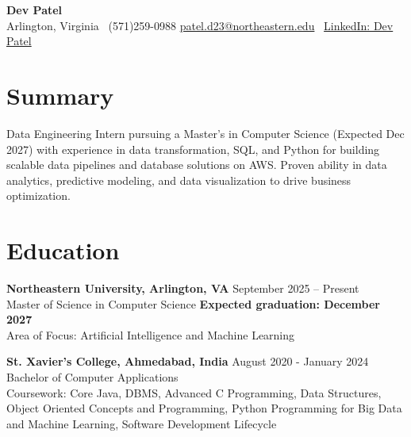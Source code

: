 \documentclass[a4paper,10pt]{article}
\begin{document}
\begin{center}
\vspace{-3mm}
    \fontsize{16}{18}\selectfont \textbf{Dev Patel} \\
    \vspace{0mm}
    \normalsize Arlington, Virginia \textbar\ (571)259-0988  \textbar       \href{mailto:patel.d23@northeastern.edu}{patel.d23@northeastern.edu} \textbar\ \href{https://www.linkedin.com/in/devxpatel//}{LinkedIn: Dev Patel} \\
\end{center}



\section*{Summary}
Data Engineering Intern pursuing a Master's in Computer Science (Expected Dec 2027) with experience in data transformation, SQL, and Python for building scalable data pipelines and database solutions on AWS. Proven ability in data analytics, predictive modeling, and data visualization to drive business optimization.
 
\vspace{ 0 mm}
\section*{Education}
\textbf{Northeastern University, Arlington, VA} \hfill September 2025 -- Present\\
Master of Science in Computer Science \hfill \textbf{Expected graduation: December 2027} \\
Area of Focus: Artificial Intelligence and Machine Learning

\vspace{1 mm} %
\textbf{St. Xavier's College, Ahmedabad, India} \hfill August 2020 - January 2024 \\
Bachelor of Computer Applications\\
Coursework: Core Java, DBMS, Advanced C Programming, Data Structures, Object Oriented Concepts and Programming, Python Programming for Big Data and Machine Learning, Software Development Lifecycle
\end{document}
